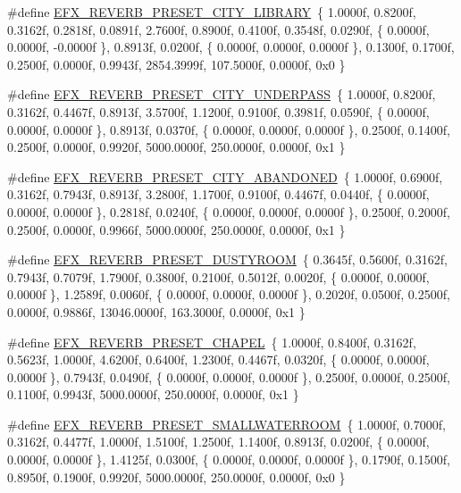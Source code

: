 \begin{DoxyCompactItemize}
\item 
\#define \hyperlink{efx-presets_8h_a1eb92f39ddc21de882008a114afd6a5a}{E\+F\+X\+\_\+\+R\+E\+V\+E\+R\+B\+\_\+\+P\+R\+E\+S\+E\+T\+\_\+\+C\+I\+T\+Y\+\_\+\+L\+I\+B\+R\+A\+RY}~\{ 1.\+0000f, 0.\+8200f, 0.\+3162f, 0.\+2818f, 0.\+0891f, 2.\+7600f, 0.\+8900f, 0.\+4100f, 0.\+3548f, 0.\+0290f, \{ 0.\+0000f, 0.\+0000f, -\/0.\+0000f \}, 0.\+8913f, 0.\+0200f, \{ 0.\+0000f, 0.\+0000f, 0.\+0000f \}, 0.\+1300f, 0.\+1700f, 0.\+2500f, 0.\+0000f, 0.\+9943f, 2854.\+3999f, 107.\+5000f, 0.\+0000f, 0x0 \}
\item 
\#define \hyperlink{efx-presets_8h_a9f13c8083a74def4b4b47e5c9b59dbed}{E\+F\+X\+\_\+\+R\+E\+V\+E\+R\+B\+\_\+\+P\+R\+E\+S\+E\+T\+\_\+\+C\+I\+T\+Y\+\_\+\+U\+N\+D\+E\+R\+P\+A\+SS}~\{ 1.\+0000f, 0.\+8200f, 0.\+3162f, 0.\+4467f, 0.\+8913f, 3.\+5700f, 1.\+1200f, 0.\+9100f, 0.\+3981f, 0.\+0590f, \{ 0.\+0000f, 0.\+0000f, 0.\+0000f \}, 0.\+8913f, 0.\+0370f, \{ 0.\+0000f, 0.\+0000f, 0.\+0000f \}, 0.\+2500f, 0.\+1400f, 0.\+2500f, 0.\+0000f, 0.\+9920f, 5000.\+0000f, 250.\+0000f, 0.\+0000f, 0x1 \}
\item 
\#define \hyperlink{efx-presets_8h_aa925be10a695b71b4e10175ea5a1e1e0}{E\+F\+X\+\_\+\+R\+E\+V\+E\+R\+B\+\_\+\+P\+R\+E\+S\+E\+T\+\_\+\+C\+I\+T\+Y\+\_\+\+A\+B\+A\+N\+D\+O\+N\+ED}~\{ 1.\+0000f, 0.\+6900f, 0.\+3162f, 0.\+7943f, 0.\+8913f, 3.\+2800f, 1.\+1700f, 0.\+9100f, 0.\+4467f, 0.\+0440f, \{ 0.\+0000f, 0.\+0000f, 0.\+0000f \}, 0.\+2818f, 0.\+0240f, \{ 0.\+0000f, 0.\+0000f, 0.\+0000f \}, 0.\+2500f, 0.\+2000f, 0.\+2500f, 0.\+0000f, 0.\+9966f, 5000.\+0000f, 250.\+0000f, 0.\+0000f, 0x1 \}
\item 
\#define \hyperlink{efx-presets_8h_a89d300c1e9b8e0eef3cb9de72c18542d}{E\+F\+X\+\_\+\+R\+E\+V\+E\+R\+B\+\_\+\+P\+R\+E\+S\+E\+T\+\_\+\+D\+U\+S\+T\+Y\+R\+O\+OM}~\{ 0.\+3645f, 0.\+5600f, 0.\+3162f, 0.\+7943f, 0.\+7079f, 1.\+7900f, 0.\+3800f, 0.\+2100f, 0.\+5012f, 0.\+0020f, \{ 0.\+0000f, 0.\+0000f, 0.\+0000f \}, 1.\+2589f, 0.\+0060f, \{ 0.\+0000f, 0.\+0000f, 0.\+0000f \}, 0.\+2020f, 0.\+0500f, 0.\+2500f, 0.\+0000f, 0.\+9886f, 13046.\+0000f, 163.\+3000f, 0.\+0000f, 0x1 \}
\item 
\#define \hyperlink{efx-presets_8h_a60e9065d8955c7c33095c82587f815f0}{E\+F\+X\+\_\+\+R\+E\+V\+E\+R\+B\+\_\+\+P\+R\+E\+S\+E\+T\+\_\+\+C\+H\+A\+P\+EL}~\{ 1.\+0000f, 0.\+8400f, 0.\+3162f, 0.\+5623f, 1.\+0000f, 4.\+6200f, 0.\+6400f, 1.\+2300f, 0.\+4467f, 0.\+0320f, \{ 0.\+0000f, 0.\+0000f, 0.\+0000f \}, 0.\+7943f, 0.\+0490f, \{ 0.\+0000f, 0.\+0000f, 0.\+0000f \}, 0.\+2500f, 0.\+0000f, 0.\+2500f, 0.\+1100f, 0.\+9943f, 5000.\+0000f, 250.\+0000f, 0.\+0000f, 0x1 \}
\item 
\#define \hyperlink{efx-presets_8h_aa3515cb632217a8fb55f06da1a4a7d1e}{E\+F\+X\+\_\+\+R\+E\+V\+E\+R\+B\+\_\+\+P\+R\+E\+S\+E\+T\+\_\+\+S\+M\+A\+L\+L\+W\+A\+T\+E\+R\+R\+O\+OM}~\{ 1.\+0000f, 0.\+7000f, 0.\+3162f, 0.\+4477f, 1.\+0000f, 1.\+5100f, 1.\+2500f, 1.\+1400f, 0.\+8913f, 0.\+0200f, \{ 0.\+0000f, 0.\+0000f, 0.\+0000f \}, 1.\+4125f, 0.\+0300f, \{ 0.\+0000f, 0.\+0000f, 0.\+0000f \}, 0.\+1790f, 0.\+1500f, 0.\+8950f, 0.\+1900f, 0.\+9920f, 5000.\+0000f, 250.\+0000f, 0.\+0000f, 0x0 \}
\end{DoxyCompactItemize}
